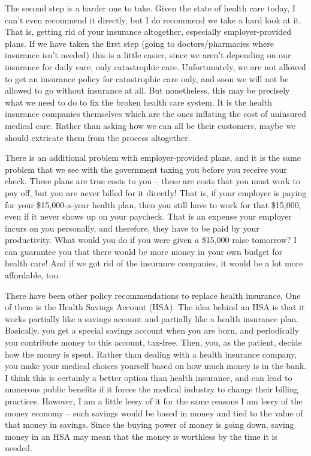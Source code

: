 The second step is a harder one to take. Given the state of health care
today, I can't even recommend it directly, but I do
recommend we take a hard look at it. That is, getting rid of your
insurance altogether, especially employer-provided plans.
 If we have taken the
first step (going to doctors/pharmacies where insurance
isn't needed) this is a little easier, since we
aren't depending on our insurance for daily care, only
catastrophic care.  Unfortunately, we are not allowed to get an
insurance policy for catastrophic care only, and soon we will not be
allowed to go without insurance at all.  But nonetheless, this may be
precisely what we need to do to fix the broken health care system.  It
is the health insurance companies themselves which are the ones
inflating the cost of uninsured medical care.  Rather than asking how
we can all be their customers, maybe we should extricate them from the
process altogether.

There is an additional problem with employer-provided plans, and it
is the same problem that we see with the government taxing you before
you receive your check.  These plans are true costs to you – these are
costs that you must work to pay off, but you are never billed for it
directly!  That is, if your employer is paying for your \$15,000-a-year
health plan, then you still have to work for that \$15,000, even if it
never shows up on your paycheck. That is an expense your employer
incurs on you personally, and therefore,
they
have to be paid by
your productivity. What would you do if you were given a \$15,000 raise
tomorrow?  I can guarantee you that there would be more money in your
own budget for health care!  And if we got rid of the insurance
companies, it would be a lot more affordable, too.

There have been other policy recommendations to replace health
insurance.  One of them is the Health Savings Account (HSA).  The idea
behind an HSA is that it works partially like a savings account and
partially like a health insurance plan.  Basically, you get a special
savings account when you are born, and periodically you contribute
money to this account, tax-free.  Then, you, as the patient, decide how
the money is spent.  Rather than dealing with a health insurance
company, you make your medical choices yourself based on how much money
is in the bank.  I think this is certainly a better option than health
insurance, and can lead to numerous public benefits if it forces the
medical industry to change their billing practices.  However, I am a
little leery of it for the same reasons I am leery of the money economy
– such savings would be based in money and tied to the value of that
money in savings.  Since the buying power of money is going down,
saving money in an HSA may mean that the money is worthless by the time
it is needed.

